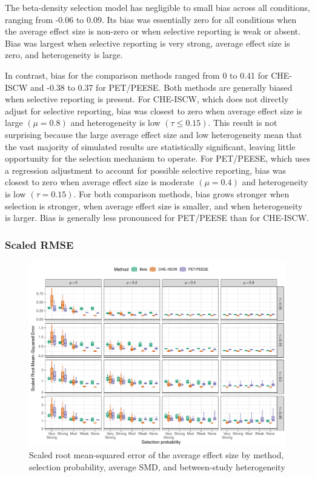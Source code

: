 \documentclass[
  man, donotrepeattitle,floatsintext]{apa7}
\begin{document}
The beta-density selection model has negligible to small bias across all conditions, ranging from -0.06 to 0.09. Its bias was essentially zero for all conditions when the average effect size is non-zero or when selective reporting is weak or absent. Bias was largest when selective reporting is very strong, average effect size is zero, and heterogeneity is large.

In contrast, bias for the comparison methods ranged from 0 to 0.41 for CHE-ISCW and -0.38 to 0.37 for PET/PEESE. Both methods are generally biased when selective reporting is present.
For CHE-ISCW, which does not directly adjust for selective reporting, bias was closest to zero when average effect size is large \((\mu = 0.8)\) and heterogeneity is low \((\tau \leq 0.15)\).
This result is not surprising because the large average effect size and low heterogeneity mean that the vast majority of simulated results are statistically significant, leaving little opportunity for the selection mechanism to operate.
For PET/PEESE, which uses a regression adjustment to account for possible selective reporting, bias was closest to zero when average effect size is moderate \((\mu = 0.4)\) and heterogeneity is low \((\tau = 0.15)\).
For both comparison methods, bias grows stronger when selection is stronger, when average effect size is smaller, and when heterogeneity is larger.
Bias is generally less pronounced for PET/PEESE than for CHE-ISCW.

\subsubsection{Scaled RMSE}\label{scaled-rmse}

\begin{figure}
\includegraphics{beta-function-selection-models-with-dependent-effects_files/figure-latex/mu-rmse-main-1} \caption{Scaled root mean-squared error of the average effect size by method, selection probability, average SMD, and between-study heterogeneity}\label{fig:mu-rmse-main}
\end{figure}
\end{document}
